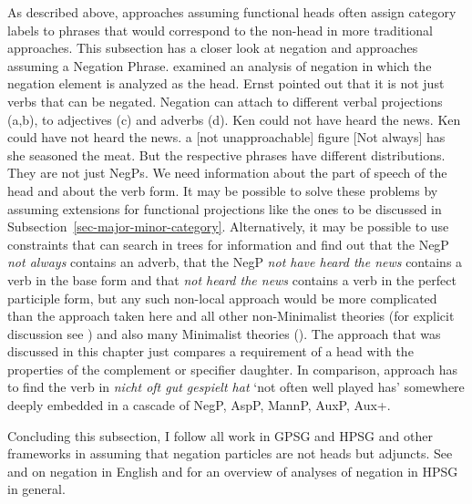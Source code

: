 As described above, approaches assuming functional heads often assign category labels to phrases
that would correspond to the non-head in more traditional approaches. This subsection has a
closer look at negation and approaches assuming a Negation Phrase. \citet{Ernst92a} examined an analysis of
negation in which the negation element is analyzed as the head. Ernst pointed out that it is
not just verbs that can be negated. Negation can attach to different verbal projections (a,b), to adjectives (c)
and adverbs (d).
\eal
\ex Ken could not have heard the news.
\ex Ken could have not heard the news.
\ex a [not unapproachable] figure
\ex {}[Not always] has she seasoned the meat.
\zl
But the respective phrases have different distributions. They are not just NegPs. We need
information about the part of speech of the head and about the verb form. It may be possible to
solve these problems by assuming extensions for functional projections like the ones to be discussed in
Subsection~\ref{sec-major-minor-category}. Alternatively, it may be possible to use constraints that
can search in trees for information and find out that the NegP \emph{not always} contains an adverb,
that the NegP \emph{not have heard the news} contains a verb in the base form and that \emph{not
  heard the news} contains a verb in the perfect participle form, but any such non-local approach
would be more complicated than the approach taken here and all other non-Minimalist theories (for
explicit discussion see \citealt{Sag2007a}) and also many Minimalist theories (\eg \citealt[]{Abraham2005a}). The approach that was discussed in this chapter just compares a requirement
  of a head with the properties of the complement or specifier daughter. In comparison, 
  approach has to find the verb in \emph{nicht oft gut gespielt hat} `not often well played has'
  somewhere deeply embedded in a cascade of NegP, AspP, MannP, AuxP, Aux+. 

Concluding this subsection, I follow all work in GPSG and HPSG and other frameworks in assuming that
negation particles are not heads but adjuncts. See  and  on negation in English and
 for an overview of analyses of negation in HPSG in general.

